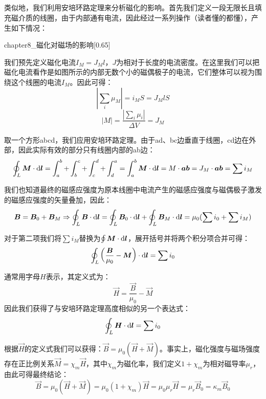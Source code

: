 \subsection[磁介质的安培定律及其应用]{}
类似地，我们利用安培环路定理来分析磁化的影响。首先我们定义一段无限长且填充磁介质的线圈，由于内部通有电流，因此经过一系列操作（读者懂的都懂），产生如下情况：
\begin{singlefigure}[磁化对磁场的影响]{chapter8_磁化对磁场的影响}[0.65]
\end{singlefigure}
我们预先定义磁化电流$I_M=J_M l$，$J$为相对于长度的电流密度。在这里我们可以把磁化电流看作是如图所示的内部无数个小的磁偶极子的电流，它们整体可以视为围绕这个线圈的电流$I_M$。因此可得：
\[|\sum_i \mu_M|=i_M S=J_M lS\]
\[|M|=\dfrac{|\sum_i\mu_i|}{\Delta V}=J_M\]

取一个方形abcd，我们应用安培环路定理。由于ad、bc边垂直于线圈，cd边在外部，因此实际有效的部分只有线圈内部的ab边：
\[\oint_L \vec{M} \cdot \dif{\vec{l}} = \int_a^b + \int_b^c + \int_c^d + \int_d^a = \int_a^b \vec{M} \cdot \dif{\vec{l}} = M \cdot \vec{ab} = J_M \cdot \vec{ab} = \sum i_M\]

我们也知道最终的磁感应强度为原本线圈中电流产生的磁感应强度与磁偶极子激发的磁感应强度的矢量叠加，因此：
\[\vec{B} = \vec{B}_0 + \vec{B}_M \Rightarrow \oint_L \vec{B} \cdot \dif{\vec{l}} = \oint_L \vec{B}_0 \cdot \dif{\vec{l}} + \oint_L \vec{B}_M \cdot \dif{\vec{l}} = \mu_0 (\sum i_0 + \sum i_M)\]

对于第二项我们将$\sum i_M$替换为$\oint \vec{M}\cdot \dif{\vec{l}}$，展开括号并将两个积分项合并可得：
\[\oint_L \left( \frac{\vec{B}}{\mu_0} - \vec{M} \right) \cdot \dif{\vec{l}} = \sum i_0\]
\begin{law}
    通常用字母$H$表示，其定义式为：
    \[\vec{H} = \frac{\vec{B}}{\mu_0} - \vec{M}\]
    因此我们获得了与安培环路定理高度相似的另一个表达式：
    \[\oint_L \vec{H} \cdot \dif{\vec{l}} = \sum i_0\]
\end{law}

根据$\vec{H}$的定义式我们可以获得：$\vec{B} = \mu_0 (\vec{H} + \vec{M})$。事实上，磁化强度与磁场强度存在正比例关系$\vec{M} = \chi_m \vec{H}$，其中$\chi_m$为磁化率，我们定义$1+\chi_m$为相对磁导率$\mu_r$，由此可得最终结论：
\[\vec{B} = \mu_0 (\vec{H} + \vec{M}) = \mu_0 (1 + \chi_m) \vec{H}= \mu_0 \mu_r \vec{H} = \mu_r \vec{B}_0 = \kappa_m \vec{B}_0\]

